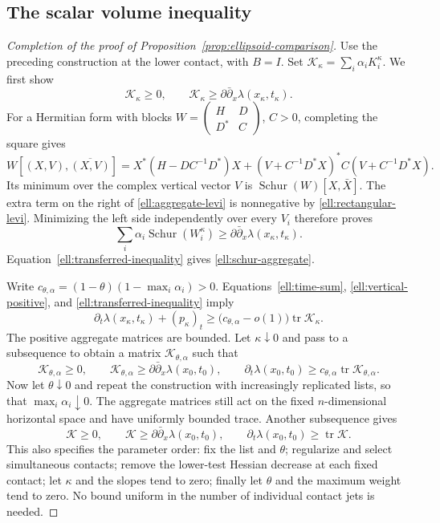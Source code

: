 \documentclass[11pt]{article}
\theoremstyle{definition}
\theoremstyle{remark}
\newcommand{\dd}{\partial\bar\partial}
\DeclareMathOperator{\tr}{tr}
\DeclareMathOperator{\Schur}{Schur}
\numberwithin{equation}{section}
\begin{document}
\subsection{The scalar volume inequality}

\begin{proof}[Completion of the proof of Proposition~\ref{prop:ellipsoid-comparison}]
Use the preceding construction at the lower contact, with $B=I$.
Set $\mathcal K_\kappa=\sum_i\alpha_iK_i^\kappa$.
We first show
\begin{equation}\label{ell:schur-aggregate}
 \mathcal K_\kappa\ge0,
 \qquad \mathcal K_\kappa\ge\dd_x\lambda(x_\kappa,t_\kappa).
\end{equation}
For a Hermitian form with blocks
$W=\left(\begin{smallmatrix}H&D\\D^*&C\end{smallmatrix}\right)$,
$C>0$, completing the square gives
\[
 W[(X,V),\overline{(X,V)}]
 =X^*(H-DC^{-1}D^*)X
   +(V+C^{-1}D^*X)^*C(V+C^{-1}D^*X).
\]
Its minimum over the complex vertical vector $V$ is
$\Schur(W)[X,\bar X]$.  The extra term on the right of
\eqref{ell:aggregate-levi} is nonnegative by
\eqref{ell:rectangular-levi}.  Minimizing the left side independently
over every $V_i$ therefore proves
\[
 \sum_i\alpha_i\Schur(W_i^\kappa)
 \ge\dd_x\lambda(x_\kappa,t_\kappa).
\]
Equation~\eqref{ell:transferred-inequality} gives
\eqref{ell:schur-aggregate}.

Write $c_{\theta,\alpha}=(1-\theta)(1-\max_i\alpha_i)>0$.
Equations~\eqref{ell:time-sum}, \eqref{ell:vertical-positive}, and
\eqref{ell:transferred-inequality} imply
\begin{equation}\label{ell:aggregate-trace}
 \partial_t\lambda(x_\kappa,t_\kappa)+(p_\kappa)_t
 \ge\bigl(c_{\theta,\alpha}-o(1)\bigr)\tr\mathcal K_\kappa.
\end{equation}
The positive aggregate matrices are bounded.  Let $\kappa\downarrow0$
and pass to a subsequence to obtain a matrix $\mathcal K_{\theta,\alpha}$
such that
\[
 \mathcal K_{\theta,\alpha}\ge0,\qquad
 \mathcal K_{\theta,\alpha}\ge\dd_x\lambda(x_0,t_0),\qquad
 \partial_t\lambda(x_0,t_0)
       \ge c_{\theta,\alpha}\tr\mathcal K_{\theta,\alpha}.
\]
Now let $\theta\downarrow0$ and repeat the construction with increasingly
replicated lists, so that $\max_i\alpha_i\downarrow0$.
The aggregate matrices still act on the fixed $n$-dimensional
horizontal space and have uniformly bounded trace.  Another
subsequence gives
\begin{equation}\label{ell:limiting-majorant}
 \mathcal K\ge0,\qquad \mathcal K\ge\dd_x\lambda(x_0,t_0),
 \qquad \partial_t\lambda(x_0,t_0)\ge\tr\mathcal K.
\end{equation}
This also specifies the parameter order: fix the list and $\theta$;
regularize and select simultaneous contacts; remove the lower-test
Hessian decrease at each fixed contact; let $\kappa$ and the slopes
tend to zero; finally let $\theta$ and the maximum weight tend to zero.
No bound uniform in the number of individual contact jets is needed.


\end{proof}
\end{document}
